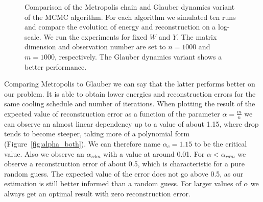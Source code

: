 \documentclass{scrartcl}
\begin{document}
\begin{figure}[h]
\begin{subfigure}{0.49\textwidth}
    \end{subfigure}
    \caption{Comparison of the Metropolis chain and Glauber dynamics variant of the MCMC algorithm. For each algorithm we simulated ten runs and compare the evolution of energy and reconstruction on a log-scale. We run the experiments for fixed $W$ and $Y$. The matrix dimension and observation number are set to $n=1000$ and $m=1000$, respectively. The Glauber dynamics variant shows a better performance.}
    \label{fig:mh_vs_glauber}
\end{figure}


Comparing Metropolis to Glauber we can say that the latter performs better on our problem. It is able to obtain lower energies and reconstruction errors for the same cooling schedule and number of iterations.
When plotting the result of the expected value of reconstruction error as a function of the parameter $\alpha = \frac{m}{n}$ we can observe an almost linear dependency up to a value of about 1.15, where drop tends to become steeper, taking more of a polynomial form (Figure~\ref{fig:alpha_both}). We can therefore name $\alpha_c = 1.15$ to be the critical value.
Also we observe an $\alpha_{rdm}$ with a value at around 0.01. For $\alpha < \alpha_{rdm}$ we observe a reconstruction error of about 0.5, which is characteristic for a pure random guess. The expected value of the error does not go above 0.5, as our estimation is still better informed than a random guess.
For larger values of $\alpha$ we always get an optimal result with zero reconstruction error.
\end{document}
